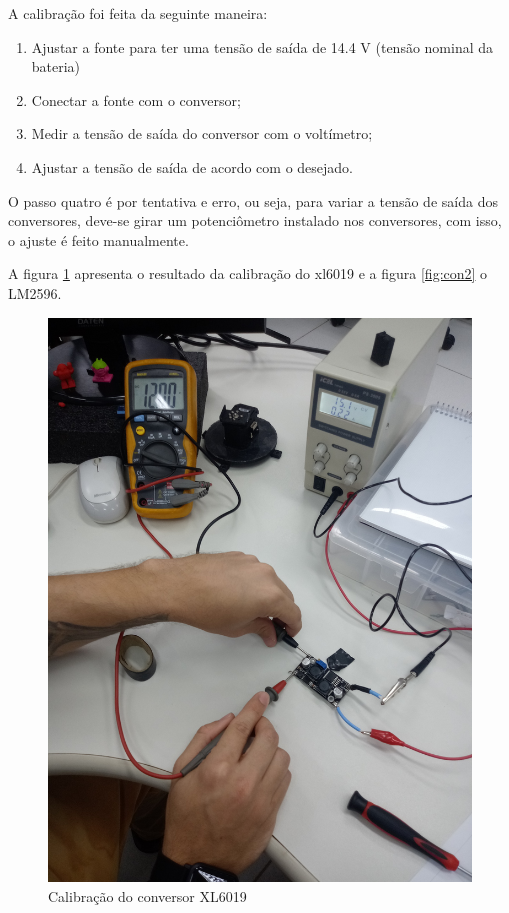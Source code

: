 A calibração foi feita da seguinte maneira:
\begin{enumerate}
	\item Ajustar a fonte para ter uma tensão de saída de 14.4 V (tensão nominal da bateria)
	\item Conectar a fonte com o conversor;
	\item Medir a tensão de saída do conversor com o voltímetro;
	\item Ajustar a tensão de saída de acordo com o desejado.
\end{enumerate}

O passo quatro é por tentativa e erro, ou seja, para variar a tensão de saída dos conversores, deve-se girar um potenciômetro instalado nos conversores, com isso, o ajuste é feito manualmente.

A figura \ref{fig:con1} apresenta o resultado da calibração do xl6019 e a figura \ref{fig:con2} o LM2596.

\begin{figure}[H]
	\centering
	\includegraphics[scale=0.4, angle=0]{Figures/conversor1.jpg}
	\caption{Calibração do conversor XL6019}
	\label{fig:con1}
\end{figure}

